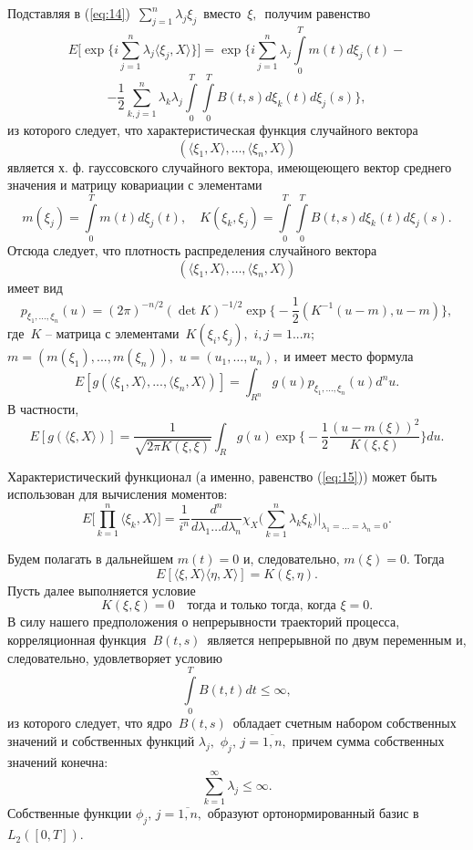\documentclass [a4paper, 12pt]{report}
\begin{document}
Подставляя в (\ref{eq:14}) $\,\sum\limits_{j=1}^n\lambda_j\xi_j\,$ вместо $\,\xi,\,$
получим равенство
$$E\Big[\exp\Big\{i\sum\limits_{j=1}^n\lambda_j\langle\xi_j,X\rangle\Big\}\Big]=
\exp\Big\{
i \sum\limits_{j=1}^n \lambda_j\int\limits_0^T m(t)d\xi_j(t)-$$
\begin{equation}\label{eq:15}
-\frac{1}{2}\sum\limits_{k,j=1}^n\lambda_k\lambda_j\int\limits_0^T\int\limits_0^T
B(t,s)d\xi_k(t)d\xi_j(s)\Big\},
\end{equation}
из которого следует, что характеристическая функция случайного вектора
$$\,(\langle\xi_1,X\rangle,\ldots,\langle\xi_n,X\rangle)\,$$
является х. ф. гауссовского случайного вектора,
имеющеющего вектор среднего значения и матрицу ковариации с элементами
$$m(\xi_j)=\int\limits_0^T m(t)d\xi_j(t),\quad
K(\xi_k,\xi_j)=\int\limits_0^T\int\limits_0^T
B(t,s)d\xi_k(t)d\xi_j(s). $$
Отсюда следует, что плотность распределения случайного вектора
$$\,(\langle\xi_1,X\rangle,\ldots,\langle\xi_n,X\rangle)\,$$
имеет вид
$$p_{\xi_1,...,\xi_n}(u)=
(2\pi)^{-n/2}(\det K)^{-1/2}\exp\Big\{-\frac{1}{2}(K^{-1}(u-m),u-m)\Big\},$$
где $\,K$ -- матрица с элементами $\, K(\xi_i,\xi_j), \,\,i,j=1...n;$
$m=(m(\xi_1),...,m(\xi_n)),$ $u=(u_1,\ldots,u_n),$ и имеет место формула
$$E[g(\langle\xi_1,X\rangle,...,\langle\xi_n,X\rangle)]=
\int_{R^n}g(u)p_{\xi_1,...,\xi_n}(u)d^n u.$$
В частности,
$$E[g(\langle\xi,X\rangle)]=
\frac{1}{\sqrt{2\pi K(\xi,\xi)}}\int_{R}g(u)
\exp\Big\{-\frac{1}{2}\frac{(u-m(\xi))^2}{K(\xi,\xi)}\Big\}du.$$

Характеристический функционал (а именно, равенство (\ref{eq:15})) может быть
использован для вычисления моментов:
\begin{equation}\label{eq:20}
E\Big[\prod\limits_{k=1}^{n}\langle\xi_k,X \rangle \Big]=
\frac{1}{i^n}\frac{d^{n}}{d\lambda_1\ldots d\lambda_{n}}
\chi_X \Big(\sum\limits_{k=1}^n\lambda_k\xi_k\Big)
\Big|_{\lambda_1=\ldots =\lambda_{n}=0}.
\end{equation}

Будем полагать в дальнейшем $m(t)=0$ и, следовательно, $m(\xi)=0.$
Тогда
$$E[\langle\xi,X\rangle\langle\eta,X\rangle]=K(\xi,\eta).$$
Пусть далее выполняется условие
\begin{equation}\label{eq:21}
K(\xi,\xi)=0 \quad \text{тогда и только тогда, когда} \,\, \xi=0.
\end{equation}
В силу нашего предположения о непрерывности траекторий процесса,
корреляционная функция $\,B(t,s)\,$ является непрерывной по двум переменным
и, следовательно, удовлетворяет условию
$$
\int\limits_0^T B(t,t)dt\leq\infty,
$$
из которого следует, что ядро $\,B(t,s)\,$ обладает
счетным набором собственных значений и собственных функций
$\lambda_j,$ $\phi_j, \, j=\overline{1,n},$
причем сумма собственных значений конечна:
$$
\sum\limits_{k=1}^{\infty}\lambda_j\leq \infty.
$$
Собственные функции $\phi_j, \, j=\overline{1,n},$ образуют
ортонормированный базис в $L_2([0,T]).$
\end{document}
